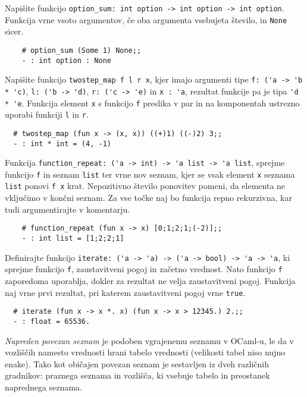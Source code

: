 \documentclass[arhiv]{../izpit}
\begin{document}
	
	

	\naloga 
  
	\podnaloga Napišite funkcijo \verb|option_sum: int option -> int option -> int option|. Funkcija vrne vsoto argumentov, če oba argumenta vsebujeta število, in \verb|None| sicer.
	\begin{verbatim}
	# option_sum (Some 1) None;;
	- : int option : None
	\end{verbatim}  
  
  \podnaloga Napišite funkcijo \verb|twostep_map f l r x|, kjer imajo argumenti tipe \verb|f: ('a -> 'b * 'c)|, \verb|l: ('b -> 'd)|, \verb|r: ('c -> 'e)| in \verb|x : 'a|, rezultat funkcije pa je tipa \verb|'d * 'e|. Funkcija element \verb|x| s funkcijo \verb|f| preslika v par in na komponentah ustrezno uporabi funkciji \verb|l| in \verb|r|.
  \begin{verbatim}
  # twostep_map (fun x -> (x, x)) ((+)1) ((-)2) 3;;
  - : int * int = (4, -1)
  \end{verbatim}
  
	\podnaloga Funkcija \verb|function_repeat: ('a -> int) -> 'a list -> 'a list|, sprejme funkcijo \verb|f| in seznam \verb|list| ter vrne nov seznam, kjer se vsak element \verb|x| seznama \verb|list| ponovi \verb|f x| krat. Nepozitivno število ponovitev pomeni, da elementa ne vključimo v končni seznam. Za vse točke naj bo funkcija repno rekurzivna, kar tudi argumentirajte v komentarju.
	\begin{verbatim}
	# function_repeat (fun x -> x) [0;1;2;1;(-2)];;
	- : int list = [1;2;2;1]
	\end{verbatim}
	
	\podnaloga Definirajte funkcijo \verb|iterate: ('a -> 'a) -> ('a -> bool) -> 'a -> 'a|, ki sprejme funkcijo \verb|f|, zaustavitveni pogoj in začetno vrednost. Nato funkcijo \verb|f| zaporedoma uporablja, dokler za rezultat ne velja zaustavitveni pogoj. Funkcija naj vrne prvi rezultat, pri katerem zaustavitveni pogoj vrne \verb|true|.
	\begin{verbatim}
  # iterate (fun x -> x *. x) (fun x -> x > 12345.) 2.;; 
  - : float = 65536.
	\end{verbatim}
  
  \naloga
  
	\textit{Napreden povezan seznam} je podoben vgrajenemu seznamu v OCaml-u, le da v vozliščih namesto vrednosti hrani tabelo vrednosti (velikosti tabel niso nujno enake). Tako kot običajen povezan seznam je sestavljen iz dveh različnih gradnikov: praznega seznama in vozlišča, ki vsebuje tabelo in preostanek naprednega seznama.
	
\end{document}
